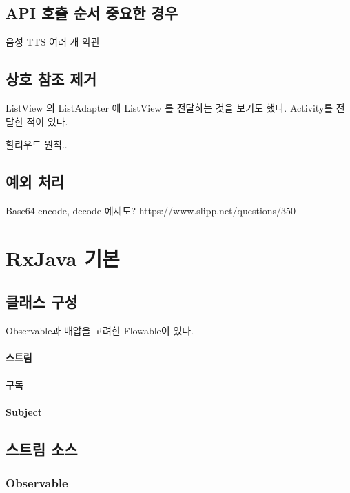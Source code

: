 \documentclass{book}
\begin{document}
\section{API 호출 순서 중요한 경우}
음성 TTS
여러 개 약관

\section{상호 참조 제거}
ListView 의 ListAdapter 에 ListView 를 전달하는 것을 보기도 했다.
Activity를 전달한 적이 있다.


할리우드 원칙..

\section{예외 처리}
Base64 encode, decode 예제도?
https://www.slipp.net/questions/350

\chapter{RxJava 기본}


\section{클래스 구성}
Observable과 배압을 고려한 Flowable이 있다.

\subsubsection{스트림}

\subsubsection{구독}

\subsubsection{Subject}

\section{스트림 소스}
\subsection{Observable}
\end{document}
